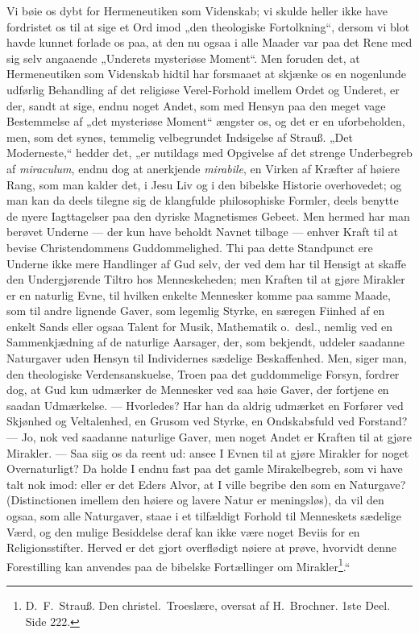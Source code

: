 \documentclass[12pt,a4paper]{book}
\begin{document}
Vi bøie os dybt for Hermeneutiken som Videnskab; vi skulde heller ikke have fordristet os til
at sige et Ord imod „den theologiske Fortolkning“, dersom vi blot havde kunnet forlade os
paa, at den nu ogsaa i alle Maader var paa det Rene med sig selv angaaende „Underets
mysteriøse Moment“. Men foruden det, at Hermeneutiken som Videnskab hidtil har forsmaaet at
skjænke os en nogenlunde udførlig Behandling af det religiøse Verel-Forhold imellem Ordet og
Underet, er der, sandt at sige, endnu noget Andet, som med Hensyn paa den meget vage
Bestemmelse af „det mysteriøse Moment“ ængster os, og det er en uforbeholden, men, som det
synes, temmelig velbegrundet Indsigelse af Strauß. „Det Moderneste,“ hedder det, „er
nutildags med Opgivelse af det strenge Underbegreb af \textit{miraculum}, endnu dog at
anerkjende
\textit{mirabile}, en Virken af Kræfter af høiere Rang, som man kalder det, i Jesu Liv og i
den bibelske Historie overhovedet; og man kan da deels tilegne sig de klangfulde
philosophiske Formler, deels benytte de nyere Iagttagelser paa den dyriske Magnetismes
Gebeet. Men hermed har man berøvet Underne --- der kun have beholdt Navnet tilbage ---
enhver Kraft til at bevise Christendommens Guddommelighed. Thi paa dette Standpunct ere
Underne ikke mere Handlinger af Gud selv, der ved dem har til Hensigt at skaffe den
Undergjørende Tiltro hos Menneskeheden; men Kraften til at gjøre Mirakler er en naturlig
Evne, til hvilken enkelte Mennesker komme paa samme Maade, som til andre lignende Gaver, som
legemlig Styrke, en særegen Fiinhed af en enkelt Sands eller ogsaa Talent for Musik,
Mathematik o.\ desl., nemlig ved en Sammenkjædning af de naturlige Aarsager, der, som
bekjendt, uddeler saadanne Naturgaver uden Hensyn til Individernes sædelige Beskaffenhed.
Men, siger man, den theologiske Verdensanskuelse, Troen paa det guddommelige Forsyn, fordrer
dog, at Gud kun udmærker de Mennesker ved saa høie Gaver, der fortjene en saadan Udmærkelse.
--- Hvorledes? Har han da aldrig udmærket en Forfører ved Skjønhed og Veltalenhed, en Grusom
ved Styrke, en Ondskabsfuld ved Forstand? --- Jo, nok ved saadanne naturlige Gaver, men noget
Andet er Kraften til at gjøre Mirakler. --- Saa siig os da reent ud: ansee I Evnen til at
gjøre Mirakler for noget Overnaturligt? Da holde I endnu fast paa det gamle Mirakelbegreb,
som vi have talt nok imod: eller er det Eders Alvor, at I ville begribe den som en Naturgave?
(Distinctionen imellem den høiere og lavere Natur er meningsløs), da vil den ogsaa, som alle
Naturgaver, staae i et tilfældigt Forhold til Menneskets sædelige Værd, og den mulige
Besiddelse deraf kan ikke være noget Beviis for en Religionsstifter. Herved er det gjort
overflødigt nøiere at
prøve, hvorvidt denne Forestilling kan anvendes paa de bibelske Fortællinger om
Mirakler\footnote{D.\ F.\ Strauß. Den christel.\ Troeslære, oversat af H.\ Brochner. 1ste
Deel. Side 222.}.“
\end{document}
